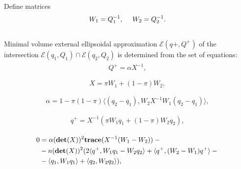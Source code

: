 \documentclass[letterpaper,10pt,english]{sphinxmanual}
\begin{document}
Define matrices
\begin{gather}
\begin{split}W_1 = Q_1^{-1}, ~~~~ W_2 = Q_2^{-1} .\label{wmatrices}\end{split}\notag\\\begin{split}\end{split}\notag
\end{gather}
Minimal volume external ellipsoidal approximation
${\mathcal E}(q+,Q^+)$ of the intersection
${\mathcal E}(q_1,Q_1)\cap{\mathcal E}(q_2,Q_2)$ is determined
from the set of equations:
\label{chap_ellcalc:equation-fusion1}\begin{gather}
\begin{split}Q^+  = \alpha X^{-1}, \\\end{split}\label{chap_ellcalc-fusion1}
\end{gather}\label{chap_ellcalc:equation-fusion2}\begin{gather}
\begin{split}X  =  \pi W_1 + (1-\pi)W_2,\\\end{split}\label{chap_ellcalc-fusion2}
\end{gather}\label{chap_ellcalc:equation-fusion3}\begin{gather}
\begin{split}\alpha  =  1-\pi(1-\pi)\langle(q_2-q_1), W_2X^{-1}W_1(q_2-q_1)\rangle, \\\end{split}\label{chap_ellcalc-fusion3}
\end{gather}\label{chap_ellcalc:equation-fusion4}\begin{gather}
\begin{split}q^+  = X^{-1}(\pi W_1q_1 + (1-\pi)W_2q_2), \\\end{split}\label{chap_ellcalc-fusion4}
\end{gather}\label{chap_ellcalc:equation-fusion5}\begin{gather}
\begin{split}0 &=  \alpha({\bf det}(X))^2{\bf trace}(X^{-1}(W_1-W_2)) - {}\\
  &- n({\bf det}(X))^2 (2\langle q^+,W_1q_1-W_2q_2\rangle + \langle q^+,(W_2-W_1)q^+\rangle - {}\\
  &- \langle q_1,W_1q_1\rangle + \langle q_2,W_2q_2\rangle),\end{split}\label{chap_ellcalc-fusion5}
\end{gather}
\end{document}
